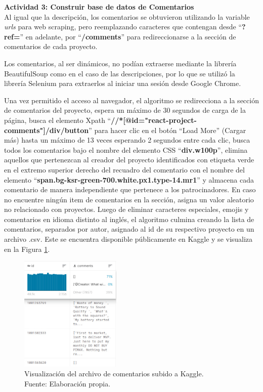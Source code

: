 \textbf{Actividad 3: Construir base de datos de Comentarios}
\\
Al igual que la descripción, los comentarios se obtuvieron utilizando la variable \textit{urls} para web scraping, pero reemplazando caracteres que contengan desde “\textbf{?ref=}” en adelante, por “\textbf{/comments}” para redireccionarse a la sección de comentarios de cada proyecto.

Los comentarios, al ser dinámicos, no podían extraerse mediante la librería BeautifulSoup como en el caso de las descripciones, por lo que se utilizó la librería Selenium para extraerlos al iniciar una sesión desde Google Chrome.

Una vez permitido el acceso al navegador, el algoritmo se redirecciona a la sección de comentarios del proyecto, espera un máximo de 30 segundos de carga de la página, busca el elemento Xpath “\textbf{//*[@id="react-project-comments"]/div/button}” para hacer clic en el botón “Load More” (Cargar más) hasta un máximo de 13 veces esperando 2 segundos entre cada clic, busca todos los comentarios bajo el nombre del elemento CSS “\textbf{div.w100p}”, elimina aquellos que pertenezcan al creador del proyecto identificados con etiqueta verde en el extremo superior derecho del recuadro del comentario con el nombre del elemento “\textbf{span.bg-ksr-green-700.white.px1.type-14.mr1}” y almacena  cada comentario de manera independiente que pertenece a los patrocinadores. En caso no encuentre ningún item de comentarios en la sección, asigna un valor aleatorio no relacionado con proyectos. Luego de eliminar caracteres especiales, emojis y comentarios en idioma distinto al inglés, el algoritmo culmina creando la lista de comentarios, separados por autor, asignado al id de su respectivo proyecto en un archivo .csv. Este se encuentra disponible públicamente en Kaggle y se visualiza en la Figura \ref{4:fig6}.

\begin{figure}[!ht]
	\begin{center}
		\includegraphics[width=0.43\textwidth]{4/figures/comments_kaggle_preview.jpg}
		\caption[Visualización del archivo de comentarios subido a Kaggle]{Visualización del archivo de comentarios subido a Kaggle.\\
			Fuente: Elaboración propia.}
		\label{4:fig6}
	\end{center}
\end{figure}

